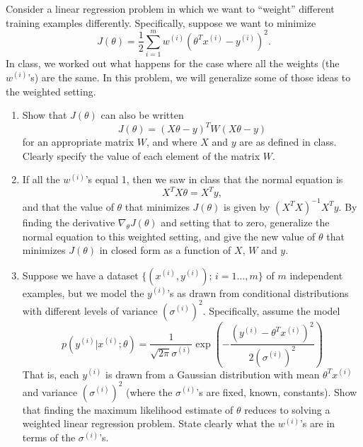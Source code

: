 \item {} Consider a linear regression problem in which
we want to ``weight'' different training examples differently.  Specifically,
suppose we want to minimize
%
\begin{equation*}
	J(\theta) = \frac{1}{2} \sum_{i=1}^m w^{(i)}
		\left(\theta^Tx^{(i)} - y^{(i)}\right)^2.
\end{equation*}
%
In class, we worked out what happens for the case where all the weights (the
$w^{(i)}$'s) are the same. In this problem, we will generalize some of those
ideas to the weighted setting.
\begin{enumerate}
	\item {} Show that $J(\theta)$ can also be written
    \begin{equation*}
    J(\theta) = (X\theta - {y})^T W (X\theta - {y})
    \end{equation*}
    for an appropriate matrix $W$, and where $X$ and ${y}$ are as
    defined in class. Clearly specify the value of each element of the matrix
    $W$.

	\item \label{item:lwr-solution}  If all the $w^{(i)}$'s
    equal 1, then we saw in class that the normal equation is
    \begin{equation*}
    X^TX\theta = X^T{y},
    \end{equation*}
	and that the value of $\theta$ that minimizes $J(\theta)$ is given by
	$(X^TX)^{-1}X^T{y}.$
	By finding the derivative $\nabla_\theta J(\theta)$ and setting that to zero,
	generalize
	the normal equation to this weighted setting, and give the new value of
	$\theta$ that minimizes
    $J(\theta)$ in closed form as a function of $X$, $W$ and ${y}$.

	\item {} Suppose we have a dataset
	$\{(x^{(i)}, y^{(i)});\, i=1\ldots,m\}$ of $m$ independent examples, but
    we model the $y^{(i)}$'s as drawn from conditional distributions with
    different levels of variance $(\sigma^{(i)})^2$. Specifically, assume the
    model
    \begin{equation*}
		p(y^{(i)} | x^{(i)} ; \theta) = \frac{1}{\sqrt{2\pi}\sigma^{(i)}} \exp\left(-
		\frac{(y^{(i)} - \theta^Tx^{(i)})^2}{2(\sigma^{(i)})^2}\right)
	\end{equation*}
    That is, each $y^{(i)}$ is drawn from a Gaussian distribution with mean
    $\theta^Tx^{(i)}$ and variance $(\sigma^{(i)})^2$ (where the
    $\sigma^{(i)}$'s are fixed, known, constants). Show that finding the
    maximum likelihood estimate of $\theta$ reduces to solving a weighted
	linear regression problem.  State clearly what the $w^{(i)}$'s are in terms of
    the $\sigma^{(i)}$'s.
\end{enumerate}

\ifnum{}
  
\fi
